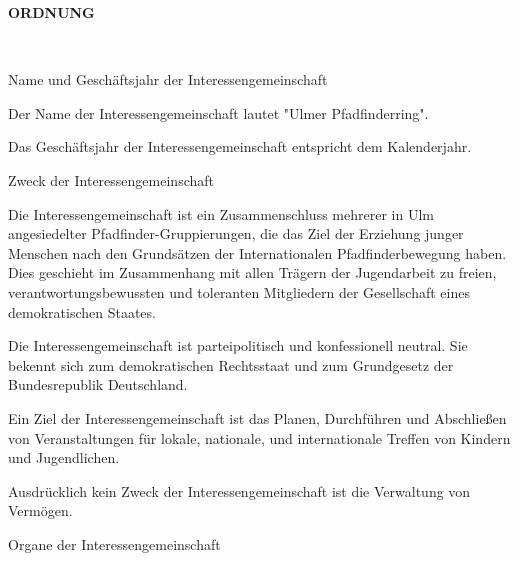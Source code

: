 \begin{Large}
    \textbf{ORDNUNG}
\end{Large}
\\



\begin{legal}
    \item Name und Geschäftsjahr der Interessengemeinschaft
        \begin{legal}
            \item Der Name der Interessengemeinschaft lautet "Ulmer Pfadfinderring".
            \item Das Geschäftsjahr der Interessengemeinschaft entspricht dem Kalenderjahr.
        \end{legal}
    \item Zweck der Interessengemeinschaft
        \begin{legal}
            \item Die Interessengemeinschaft ist ein Zusammenschluss mehrerer in Ulm angesiedelter
                  Pfadfinder-Gruppierungen, die das Ziel der Erziehung junger Menschen nach den 
                  Grundsätzen der Internationalen Pfadfinderbewegung haben. Dies geschieht im Zusammenhang 
                  mit allen Trägern der Jugendarbeit zu freien, verantwortungsbewussten und 
                  toleranten Mitgliedern der Gesellschaft eines demokratischen Staates.
            \item Die Interessengemeinschaft ist parteipolitisch und konfessionell neutral. 
                  Sie bekennt sich zum demokratischen Rechtsstaat und zum Grundgesetz der 
                  Bundesrepublik Deutschland.
            \item Ein Ziel der Interessengemeinschaft ist das Planen, Durchführen und Abschließen 
                  von Veranstaltungen für lokale, nationale, und internationale Treffen von 
                  Kindern und Jugendlichen.
            \item Ausdrücklich kein Zweck der Interessengemeinschaft ist die Verwaltung von        
                  Vermögen.
        \end{legal}
    \item Organe der Interessengemeinschaft
        \begin{legal}

\end{legal}
\end{legal}
